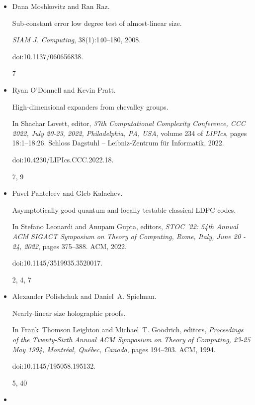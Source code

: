 \begin{itemize}
\item[] 
[29]

Dana Moshkovitz and Ran Raz.


Sub-constant error low degree test of almost-linear size.


\emph{SIAM J. Computing}, 38(1):140–180, 2008.


doi:10.1137/060656838.


7




\item[] 
[30]

Ryan O’Donnell and Kevin Pratt.


High-dimensional expanders from chevalley groups.


In Shachar Lovett, editor, \emph{37th Computational Complexity
Conference, CCC 2022, July 20-23, 2022, Philadelphia, PA, USA}, volume
234 of \emph{LIPIcs}, pages 18:1–18:26. Schloss Dagstuhl – Leibniz-Zentrum
für Informatik, 2022.


doi:10.4230/LIPIcs.CCC.2022.18.


7, 9




\item[] 
[31]

Pavel Panteleev and Gleb Kalachev.


Asymptotically good quantum and locally testable classical LDPC
codes.


In Stefano Leonardi and Anupam Gupta, editors, \emph{STOC ’22: 54th
Annual ACM SIGACT Symposium on Theory of Computing, Rome, Italy, June 20
- 24, 2022}, pages 375–388. ACM, 2022.


doi:10.1145/3519935.3520017.


2, 4, 7




\item[] 
[32]

Alexander Polishchuk and Daniel A. Spielman.


Nearly-linear size holographic proofs.


In Frank Thomson Leighton and Michael T. Goodrich, editors, \emph{Proceedings of the Twenty-Sixth Annual ACM Symposium on Theory of
Computing, 23-25 May 1994, Montréal, Québec, Canada}, pages
194–203. ACM, 1994.


doi:10.1145/195058.195132.


5, 40




\item[] 
[33]


\end{itemize}
